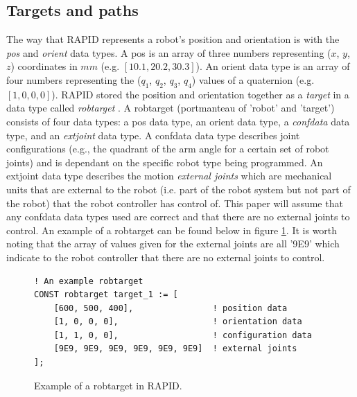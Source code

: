 \documentclass{cslthse-msc}
\begin{document}
\subsection{Targets and paths}
\label{sec:Tech_Back:Rob_Move:target_path}
The way that RAPID represents a robot's position and orientation is with the \textit{pos} and \textit{orient} data types. A pos \cite[Sec. 3.56]{ABB:rapid_instructions} is an array of three numbers representing ($x$, $y$, $z$) coordinates in $mm$ (e.g. $[10.1, 20.2, 30.3]$). An orient data type \cite[Sec. 3.52]{ABB:rapid_instructions} is an array of four numbers representing the ($q_1$, $q_2$, $q_3$, $q_4$) values of a quaternion (e.g. $[1, 0, 0, 0]$). RAPID stored the position and orientation together as a \textit{target} in a data type called \textit{robtarget} \cite[Sec. 3.67]{ABB:rapid_instructions}. A robtarget (portmanteau of 'robot' and 'target') consists of four data types: a pos data type, an orient data type, a \textit{confdata} \cite[Sec. 3.17]{ABB:rapid_instructions} data type, and an \textit{extjoint}\cite[Sec. 3.34]{ABB:rapid_instructions} data type. A confdata data type describes joint configurations (e.g., the quadrant of the arm angle for a certain set of robot joints) and is dependant on the specific robot type being programmed. An extjoint data type describes the motion \textit{external joints} which are mechanical units that are external to the robot (i.e. part of the robot system but not part of the robot) that the robot controller has control of. This paper will assume that any confdata data types used are correct and that there are no external joints to control. An example of a robtarget can be found below in figure \ref{fig:RAPID_robtarget}. It is worth noting that the array of values given for the external joints are all '9E9' which indicate to the robot controller that there are no external joints to control. 

\lstset{language=RAPID}
\begin{figure}[H]
\centering
\begin{lstlisting}
! An example robtarget
CONST robtarget target_1 := [ 
    [600, 500, 400],                ! position data
    [1, 0, 0, 0],                   ! orientation data
    [1, 1, 0, 0],                   ! configuration data
    [9E9, 9E9, 9E9, 9E9, 9E9, 9E9]  ! external joints
];

\end{lstlisting}
\caption{Example of a robtarget in RAPID.}
\label{fig:RAPID_robtarget}
\end{figure}
\end{document}
